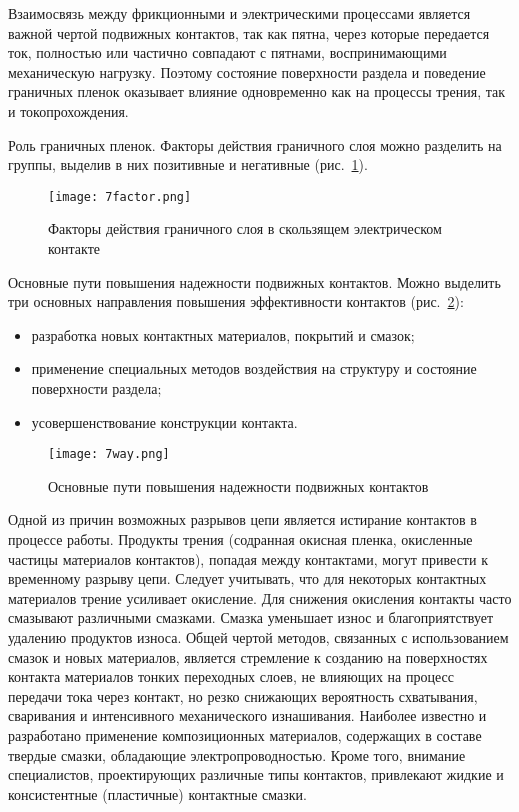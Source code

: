 Взаимосвязь между фрикционными и электрическими процессами является важной чертой подвижных контактов, так как пятна, через которые передается ток, полностью или частично совпадают с пятнами, воспринимающими механическую нагрузку. Поэтому состояние поверхности раздела и поведение граничных пленок оказывает влияние одновременно как на процессы трения, так и токопрохождения.

Роль граничных пленок. Факторы действия граничного слоя можно разделить на группы, выделив в них позитивные и негативные (рис.~\ref{pic:7factor}).

\begin{figure}[h!]
	\caption{ Факторы действия граничного слоя в скользящем электрическом контакте }
	\texttt{[image: 7factor.png]}
	\label{pic:7factor}
\end{figure}

Основные пути повышения надежности подвижных контактов. Можно выделить три основных направления повышения эффективности контактов (рис.~\ref{pic:7way}):
\begin{itemize}
\item разработка новых контактных материалов, покрытий и смазок;
\item применение специальных методов воздействия на структуру и состояние поверхности раздела;
\item усовершенствование конструкции контакта.
\end{itemize}

\begin{figure}[h!]
	\caption{ Основные пути повышения надежности подвижных контактов }
	\texttt{[image: 7way.png]}
	\label{pic:7way}
\end{figure}

Одной из причин возможных разрывов цепи является истирание контактов в процессе работы. Продукты трения (содранная окисная пленка, окисленные частицы материалов контактов), попадая между контактами, могут привести к временному разрыву цепи. Следует учитывать, что для некоторых контактных материалов трение усиливает окисление. Для снижения окисления контакты часто смазывают различными смазками. Смазка уменьшает износ и благоприятствует удалению продуктов износа. Общей чертой методов, связанных с использованием смазок и новых материалов, является стремление к созданию на поверхностях контакта материалов тонких переходных слоев, не влияющих на процесс передачи тока через контакт, но резко снижающих вероятность схватывания, сваривания и интенсивного механического изнашивания. Наиболее известно и разработано применение композиционных материалов, содержащих в составе твердые смазки, обладающие электропроводностью. Кроме того, внимание специалистов, проектирующих различные типы контактов, привлекают жидкие и консистентные (пластичные) контактные смазки.

